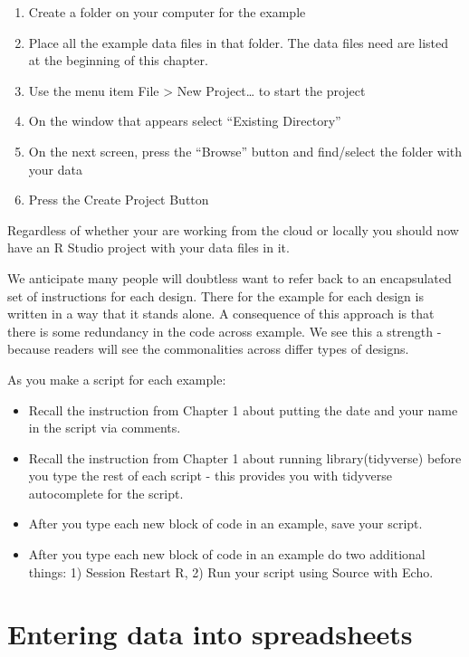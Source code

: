 \documentclass[
]{krantz}
\begin{document}
\begin{enumerate}
\def\labelenumi{\arabic{enumi}.}
\item
  Create a folder on your computer for the example
\item
  Place all the example data files in that folder. The data files need are listed at the beginning of this chapter.
\item
  Use the menu item File \textgreater{} New Project\ldots{} to start the project
\item
  On the window that appears select ``Existing Directory''
\item
  On the next screen, press the ``Browse'' button and find/select the folder with your data
\item
  Press the Create Project Button
\end{enumerate}

Regardless of whether your are working from the cloud or locally you should now have an R Studio project with your data files in it.

We anticipate many people will doubtless want to refer back to an encapsulated set of instructions for each design. There for the example for each design is written in a way that it stands alone. A consequence of this approach is that there is some redundancy in the code across example. We see this a strength - because readers will see the commonalities across differ types of designs.

As you make a script for each example:

\begin{itemize}
\item
  Recall the instruction from Chapter 1 about putting the date and your name in the script via comments.
\item
  Recall the instruction from Chapter 1 about running library(tidyverse) before you type the rest of each script - this provides you with tidyverse autocomplete for the script.
\item
  After you type each new block of code in an example, save your script.
\item
  After you type each new block of code in an example do two additional things: 1) Session Restart R, 2) Run your script using Source with Echo.
\end{itemize}

\hypertarget{entering-data-into-spreadsheets}{%
\section{Entering data into spreadsheets}\label{entering-data-into-spreadsheets}}
\end{document}
